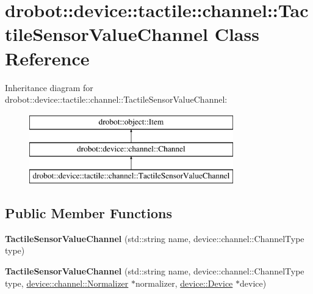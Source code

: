 \hypertarget{classdrobot_1_1device_1_1tactile_1_1channel_1_1TactileSensorValueChannel}{\section{drobot\-:\-:device\-:\-:tactile\-:\-:channel\-:\-:Tactile\-Sensor\-Value\-Channel Class Reference}
\label{classdrobot_1_1device_1_1tactile_1_1channel_1_1TactileSensorValueChannel}
}
Inheritance diagram for drobot\-:\-:device\-:\-:tactile\-:\-:channel\-:\-:Tactile\-Sensor\-Value\-Channel\-:\begin{figure}[H]
\begin{center}
\leavevmode
\includegraphics[height=3.000000cm]{classdrobot_1_1device_1_1tactile_1_1channel_1_1TactileSensorValueChannel}
\end{center}
\end{figure}
\subsection*{Public Member Functions}
\begin{DoxyCompactItemize}
\item 
\hypertarget{classdrobot_1_1device_1_1tactile_1_1channel_1_1TactileSensorValueChannel_a8ea17745d81716bed41136ef4cb62d5f}{{\bfseries Tactile\-Sensor\-Value\-Channel} (std\-::string name, device\-::channel\-::\-Channel\-Type type)}\label{classdrobot_1_1device_1_1tactile_1_1channel_1_1TactileSensorValueChannel_a8ea17745d81716bed41136ef4cb62d5f}

\item 
\hypertarget{classdrobot_1_1device_1_1tactile_1_1channel_1_1TactileSensorValueChannel_ac3175e796c2e1b3d5bf1efabe2650927}{{\bfseries Tactile\-Sensor\-Value\-Channel} (std\-::string name, device\-::channel\-::\-Channel\-Type type, \hyperlink{classdrobot_1_1device_1_1channel_1_1Normalizer}{device\-::channel\-::\-Normalizer} $\ast$normalizer, \hyperlink{classdrobot_1_1device_1_1Device}{device\-::\-Device} $\ast$device)}\label{classdrobot_1_1device_1_1tactile_1_1channel_1_1TactileSensorValueChannel_ac3175e796c2e1b3d5bf1efabe2650927}

\end{DoxyCompactItemize}
